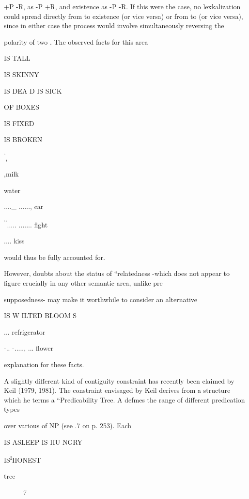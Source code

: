 +P {}-R,  as {}-P +R, and existence as {}-P {}-R. If this were the case, no lexkalization could spread directly from  to exis\-tence (or vice versa) or from  to  (or vice versa), since in either case the process would involve simultaneously reversing the

polarity of two . The observed facts for this area

IS TALL

IS SKINNY 

IS DEA D IS SICK

OF BOXES

IS FIXED

IS BROKEN

\textsuperscript{'},


,milk

water

....\_ ......, car

\textsuperscript{'}\textsuperscript{'}..... ....... fight

.... kiss

would thus be fully accounted for. 

However, doubts about the status of ``relatedness {}-which does not appear to figure crucially in any other semantic area, unlike pre\-

supposedness- may make it worthwhile to consider an alternative

IS W ILTED BLOOM S 

... refrigerator

{}-.. {}-....., ... flower

explanation for these facts.

A slightly different kind of contiguity constraint has recently been claimed by Keil (1979, 1981). The constraint envisaged by Keil derives from a structure which he terms a ``Predicability Tree. A  defmes the range of different predication types

over various  of NP (see .7 on p. 253). Each

IS ASLEEP IS HU NGRY

IS\textsuperscript{I}HONEST 

tree

\begin{figure}
\caption{7}
\label{fig:4}
\end{figure}

